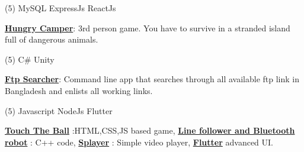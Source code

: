 \documentclass[mm]{simple_style}
\let\oldhref\href
\renewcommand{\href}[2]{\oldhref{#1}{\bfseries#2}}
\begin{document}
\begin{resume}
\vspace{-4mm}
\begin{tasks}[style=itemize ,label=\textcolor{gray}{$\bullet$}](5)
\task \textwidth{\hfil JavaScript}
\task MySQL
\task ExpressJs
\task ReactJs
\end{tasks}
\vspace{-2mm}
\href{https://github.com/Sourav9063/Hungry-Camper-scripts}{Hungry Camper}: 3rd person game. You have to survive in a stranded island full of dangerous animals.
\vspace{-4mm}
\begin{tasks}[style=itemize ,label=\textcolor{gray}{$\bullet$}](5)
\task[] \hspace
\task C{\lserif\#} 
\task Unity 
\end{tasks}
\vspace{-2mm}
\href{https://github.com/Sourav9063/ftp_searcher}{Ftp Searcher}: Command line app that searches through all available ftp link in Bangladesh and enlists all working links.
\vspace{-4mm}
\begin{tasks}[style=itemize ,label=\textcolor{gray}{$\bullet$}](5)
\task[] \hspace
\task[] \hspace
\task Javascript 
\task NodeJs 
\task Flutter
\end{tasks}
\vspace{-2mm}
\href{https://sourav9063.github.io/Touch-The-Ball/}{Touch The Ball} :HTML,CSS,JS based game, \href{https://github.com/Sourav9063/Arduino-projects-linefollower-git}{Line follower and Bluetooth robot} : C++ code, \href{https://github.com/Sourav9063/splayer}{Splayer} : Simple video player, \href{https://github.com/Sourav9063/flutter_learning}{Flutter} advanced UI. \hspace\\
\sectionline
\vspace{-7mm}

\end{resume}
\end{document}
